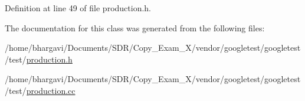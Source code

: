 Definition at line 49 of file production.\+h.



The documentation for this class was generated from the following files\+:\begin{DoxyCompactItemize}
\item 
/home/bhargavi/\+Documents/\+S\+D\+R/\+Copy\+\_\+\+Exam\+\_\+X/vendor/googletest/googletest/test/\hyperlink{production_8h}{production.\+h}\item 
/home/bhargavi/\+Documents/\+S\+D\+R/\+Copy\+\_\+\+Exam\+\_\+X/vendor/googletest/googletest/test/\hyperlink{production_8cc}{production.\+cc}\end{DoxyCompactItemize}
